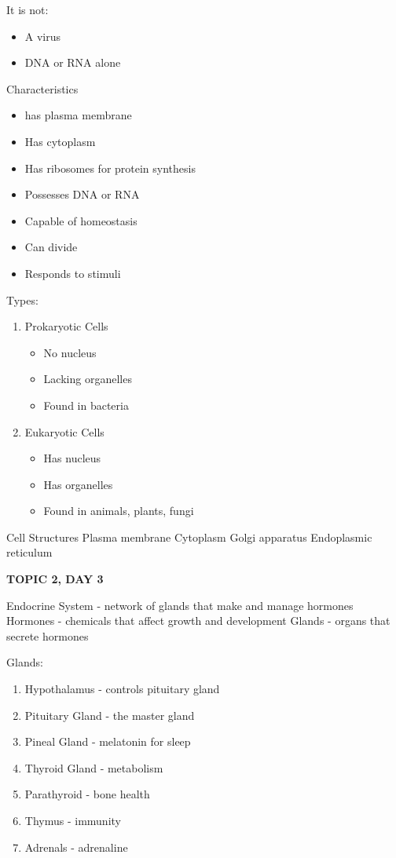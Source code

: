 {{It is not:
\begin{itemize}
    \item A virus
    \item DNA or RNA alone
\end{itemize}


Characteristics
\begin{itemize}
    \item has plasma membrane
    \item Has cytoplasm
    \item Has ribosomes for protein synthesis
    \item Possesses DNA or RNA
    \item Capable of homeostasis
    \item Can divide 
    \item Responds to stimuli
\end{itemize}


Types:
\begin{enumerate}
    \item Prokaryotic Cells
    \begin{itemize}
        \item No nucleus
        \item Lacking organelles
        \item Found in bacteria
    \end{itemize}
    \item Eukaryotic Cells
    \begin{itemize}
        \item Has nucleus
        \item Has organelles
        \item Found in animals, plants, fungi
    \end{itemize}
\end{enumerate} 


Cell Structures
Plasma membrane
Cytoplasm
Golgi apparatus
Endoplasmic reticulum

\textbf{TOPIC 2, DAY 3}


Endocrine System - network of glands that make and manage hormones
Hormones - chemicals that affect growth and development
Glands - organs that secrete hormones


Glands:
\begin{enumerate}
    \item Hypothalamus - controls pituitary gland
    \item Pituitary Gland - the master gland
    \item Pineal Gland - melatonin for sleep
    \item Thyroid Gland - metabolism
    \item Parathyroid - bone health
    \item Thymus - immunity
    \item Adrenals - adrenaline 
\end{enumerate} 


}}
